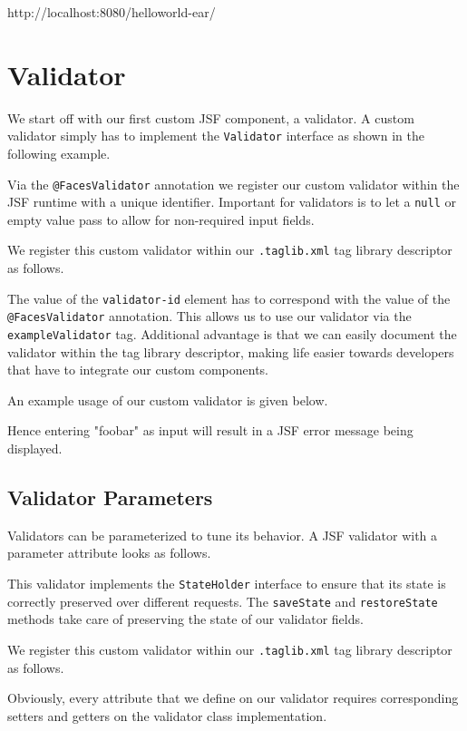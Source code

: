 http://localhost:8080/helloworld-ear/

\section{Validator}
\label{sec:validator}
We start off with our first custom JSF component, a validator.
A custom validator simply has to implement the \texttt{Validator} interface as shown in the following example.

Via the \texttt{@FacesValidator} annotation we register our custom validator within the JSF runtime with a unique identifier.
Important for validators is to let a \texttt{null} or empty value pass to allow for non-required input fields.

We register this custom validator within our \texttt{.taglib.xml} tag library descriptor as follows.

The value of the \texttt{validator-id} element has to correspond with the value of the \texttt{@Faces\allowbreak Validator} annotation.
This allows us to use our validator via the \texttt{exampleValidator} tag.
Additional advantage is that we can easily document the validator within the tag library descriptor, making life easier towards developers that have to integrate our custom components.

An example usage of our custom validator is given below.

Hence entering "foobar" as input will result in a JSF error message being displayed.


\subsection{Validator Parameters}
Validators can be parameterized to tune its behavior. 
A JSF  validator with a parameter attribute looks as follows.

This validator implements the \texttt{StateHolder} interface to ensure that its state is correctly preserved over different requests.
The \texttt{saveState} and \texttt{restoreState} methods take care of preserving the state of our validator fields.

We register this custom validator within our \texttt{.taglib.xml} tag library descriptor as follows.

Obviously, every attribute that we define on our validator requires corresponding setters and getters on the validator class implementation.

